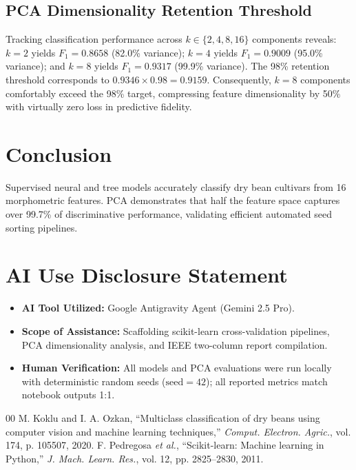 \documentclass[conference]{IEEEtran}
\begin{document}
\subsection{PCA Dimensionality Retention Threshold}
Tracking classification performance across $k \in \{2, 4, 8, 16\}$ components reveals: $k=2$ yields $F_1=0.8658$ (82.0\% variance); $k=4$ yields $F_1=0.9009$ (95.0\% variance); and $k=8$ yields $F_1=0.9317$ (99.9\% variance). The 98\% retention threshold corresponds to $0.9346 \times 0.98 = 0.9159$. Consequently, $k=8$ components comfortably exceed the 98\% target, compressing feature dimensionality by 50\% with virtually zero loss in predictive fidelity.

\section{Conclusion}
Supervised neural and tree models accurately classify dry bean cultivars from 16 morphometric features. PCA demonstrates that half the feature space captures over 99.7\% of discriminative performance, validating efficient automated seed sorting pipelines.

\newpage
\section*{AI Use Disclosure Statement}
\begin{itemize}
\item \textbf{AI Tool Utilized:} Google Antigravity Agent (Gemini 2.5 Pro).
\item \textbf{Scope of Assistance:} Scaffolding scikit-learn cross-validation pipelines, PCA dimensionality analysis, and IEEE two-column report compilation.
\item \textbf{Human Verification:} All models and PCA evaluations were run locally with deterministic random seeds ($\text{seed}=42$); all reported metrics match notebook outputs 1:1.
\end{itemize}

\begin{thebibliography}{00}
 M. Koklu and I. A. Ozkan, ``Multiclass classification of dry beans using computer vision and machine learning techniques,'' \textit{Comput. Electron. Agric.}, vol. 174, p. 105507, 2020.
 F. Pedregosa \textit{et al.}, ``Scikit-learn: Machine learning in Python,'' \textit{J. Mach. Learn. Res.}, vol. 12, pp. 2825--2830, 2011.
\end{thebibliography}
\end{document}
